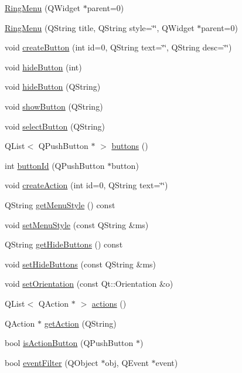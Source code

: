 \begin{DoxyCompactItemize}
\item 
\hyperlink{classRingMenu_a161290d15ceb65ba81a049b050d73fd9}{RingMenu} (QWidget $\ast$parent=0)
\item 
\hyperlink{classRingMenu_a9315b3098d82e38ba24dab2be77ad49d}{RingMenu} (QString title, QString style=\char`\"{}\char`\"{}, QWidget $\ast$parent=0)
\item 
void \hyperlink{classRingMenu_a76fe327229667a0dda2b9b6bc4103203}{createButton} (int id=0, QString text=\char`\"{}\char`\"{}, QString desc=\char`\"{}\char`\"{})
\item 
void \hyperlink{classRingMenu_afccef718c896d4efc1085f05b4ae9737}{hideButton} (int)
\item 
void \hyperlink{classRingMenu_ac0ebc3b36ea3ae2d25e9471fac6ab271}{hideButton} (QString)
\item 
void \hyperlink{classRingMenu_a5bd5285d8e3e6de5fbcb0c96de75110c}{showButton} (QString)
\item 
void \hyperlink{classRingMenu_a8d76f877a6936c9392a91226e9f7aab9}{selectButton} (QString)
\item 
QList$<$ QPushButton $\ast$ $>$ \hyperlink{classRingMenu_ac3ba363326a56f30fd7fa7417f77a2cd}{buttons} ()
\item 
int \hyperlink{classRingMenu_adde629b6589c82f0457bf4091827878e}{buttonId} (QPushButton $\ast$button)
\item 
void \hyperlink{classRingMenu_a86e635c5a4ad42e3d8615d7f041d5a2e}{createAction} (int id=0, QString text=\char`\"{}\char`\"{})
\item 
QString \hyperlink{classRingMenu_a4255e9fe83130885f7f8d2e32d7555bf}{getMenuStyle} () const 
\item 
void \hyperlink{classRingMenu_a6a2d9d48229e85f036cf51e738092ff7}{setMenuStyle} (const QString \&ms)
\item 
QString \hyperlink{classRingMenu_a124f8251bf13042eed80479e7661ab5f}{getHideButtons} () const 
\item 
void \hyperlink{classRingMenu_a863af1bf79f57086df81812774a9d1ac}{setHideButtons} (const QString \&ms)
\item 
void \hyperlink{classRingMenu_a2daf310042d624f5bb16a21ca5833f69}{setOrientation} (const Qt::Orientation \&o)
\item 
QList$<$ QAction $\ast$ $>$ \hyperlink{classRingMenu_a051677097bff295a68a8d00d21b3cd16}{actions} ()
\item 
QAction $\ast$ \hyperlink{classRingMenu_a92c0197723e41fb50a464c4880226466}{getAction} (QString)
\item 
bool \hyperlink{classRingMenu_ac80fd9e02e31d943615f69d5e7a998aa}{isActionButton} (QPushButton $\ast$)
\item 
bool \hyperlink{classRingMenu_ab6098f804da03d7fc319d95567f09a01}{eventFilter} (QObject $\ast$obj, QEvent $\ast$event)
\end{DoxyCompactItemize}
